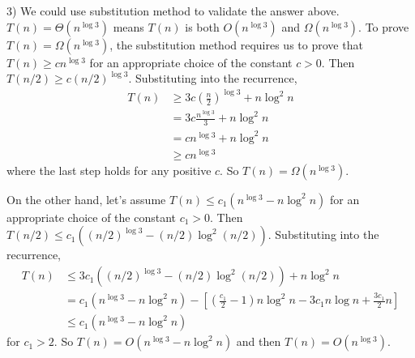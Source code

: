 \documentclass[twoside,11pt]{homework}
\begin{document}
3) We could use substitution method to validate the answer above. 
$T(n) =  \Theta(n^{\log 3}) $ means $T(n)$ is both $O(n^{\log 3})$ and $\Omega(n^{\log 3})$.
To prove $T(n) = \Omega(n^{\log 3})$, the substitution method requires us to prove that $T(n) \ge c n^{\log3}$ for an appropriate choice of the constant $c > 0$.
Then $T(n/2) \ge c (n/2)^{\log 3}$.
Substituting into the recurrence,
%
\begin{equation}
\begin{split}
T(n) & \ge 3 c (\frac{n}{2})^{\log 3} + n \log^2 n \\
        &=  3 c \frac{n^{\log 3}}{3}+ n \log^2 n \\
        &= c n^{\log3} + n \log^2 n \\
        & \ge c n^{\log3}
\end{split}
\end{equation}
%
where the last step holds for any positive $c$.
So  $T(n) = \Omega(n^{\log 3})$.

On the other hand, let's assume $T(n) \le c_1(n^{\log 3} - n \log^2 n)$ for an appropriate choice of the constant $c_1 > 0$.
Then $T(n/2) \le c_1((n/2)^{\log 3} - (n/2) \log^2 (n/2))$.
Substituting into the recurrence,
%
\begin{equation}
\begin{split}
T(n) & \le 3 c_1((n/2)^{\log 3} - (n/2) \log^2 (n/2)) + n \log^2 n \\
        &=  c_1(n^{\log 3} - n \log^2 n) - [(\frac{c_1}{2} - 1)n \log^2 n - 3c_1 n \log n + \frac{3c_1}{2}n] \\
        & \le c_1(n^{\log 3} - n \log^2 n)
\end{split}
\end{equation}
%
for $c_1 > 2$.
So $T(n) = O(n^{\log 3} - n \log^2 n)$ and then $T(n) = O(n^{\log 3})$.
\end{document}
